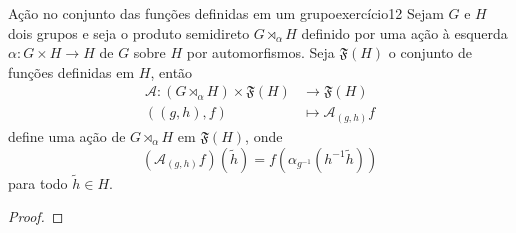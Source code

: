 \begin{proposition}{Ação no conjunto das funções definidas em um grupo}{exercício12}
    Sejam \(G\) e \(H\) dois grupos e seja o produto semidireto \(G \rtimes_{\alpha} H\) definido por uma ação à esquerda \(\alpha : G \times H \to H\) de \(G\) sobre \(H\) por automorfismos. Seja \(\mathfrak{F}(H)\) o conjunto de funções definidas em \(H\), então
    \begin{align*}
        \mathscr{A} : (G \rtimes_{\alpha} H) \times \mathfrak{F}(H) &\to \mathfrak{F}(H)\\
                                                          ((g,h),f) &\mapsto \mathscr{A}_{(g,h)}f
    \end{align*}
    define uma ação de \(G \rtimes_{\alpha} H\) em \(\mathfrak{F}(H)\), onde
    \begin{equation*}
        \left(\mathscr{A}_{(g,h)}f\right)(\tilde{h}) = f\left(\alpha_{g^{-1}}(h^{-1}\tilde{h})\right)
    \end{equation*}
    para todo \(\tilde{h} \in H\).
\end{proposition}
\begin{proof}

\end{proof}
